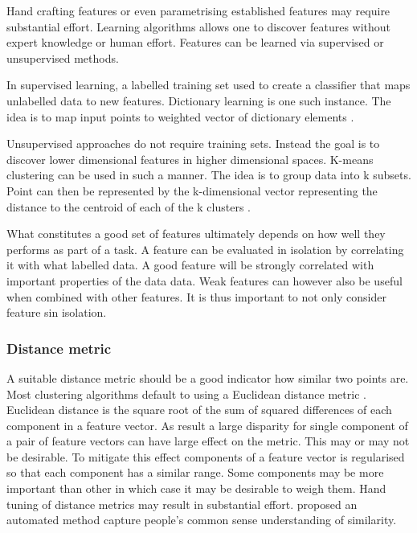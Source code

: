 Hand crafting features or even parametrising established features may require substantial effort. Learning algorithms allows one to discover features without expert knowledge or human effort. Features can be learned via supervised or unsupervised methods.

In supervised learning, a labelled training set used to create a classifier that maps unlabelled data to new features. Dictionary learning is one such instance. The idea is to map input points to weighted vector of dictionary elements \cite{Mairal2009}.

Unsupervised approaches do not require training sets. Instead the goal is to discover lower dimensional features in higher dimensional spaces. K-means clustering can be used in such a manner. The idea is to group data into k subsets. Point can then be represented by the k-dimensional vector representing the distance to the centroid of each of the k clusters \cite{Coates2012}.

What constitutes a good set of features ultimately depends on how well they performs as part of a task. A feature can be evaluated in isolation by correlating it with what labelled data. A good feature will be strongly correlated with important properties of the data data. Weak features can however also be useful when combined with other features. It is thus important to not only consider feature sin isolation.





\subsubsection*{Distance metric}

A suitable distance metric should be a good indicator how similar two points are. Most clustering algorithms default to using a Euclidean distance metric \cite{Grabusts2011}. Euclidean distance is the square root of the sum of squared differences of each component in a feature vector. As result a large disparity for single component of a pair of feature vectors can have large effect on the metric. This may or may not be desirable. To mitigate this effect components of a feature vector is regularised so that each component has a similar range. Some components may be more important than other in which case it may be desirable to weigh them. Hand tuning of distance metrics may result in substantial effort. \citet{Xing2002} proposed an automated method capture people's common sense understanding of similarity.


